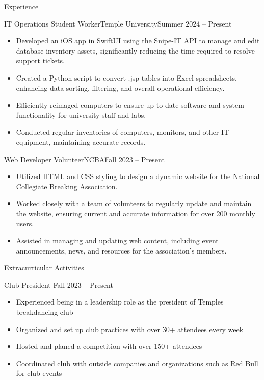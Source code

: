 \documentclass[]{mcdowellcv}
\begin{document}
	\begin{cvsection}{Experience}
		\begin{cvsubsection}{IT Operations Student Worker}{Temple University}{Summer 2024 -- Present}			
			\begin{itemize}
				\item Developed an iOS app in SwiftUI using the Snipe-IT API to manage and edit database inventory assets, significantly reducing the time required to resolve support tickets.
				\item Created a Python script to convert .jsp tables into Excel spreadsheets, enhancing data sorting, filtering, and overall operational efficiency.
				\item Efficiently reimaged computers to ensure up-to-date software and system functionality for university staff and labs.
				\item Conducted regular inventories of computers, monitors, and other IT equipment, maintaining accurate records.
			\end{itemize}
		\end{cvsubsection}
		
		\begin{cvsubsection}{Web Developer Volunteer}{NCBA}{Fall 2023 -- Present}	
			\begin{itemize}
				\item Utilized HTML and CSS styling to design a dynamic website for the National Collegiate Breaking Association.
				\item Worked closely with a team of volunteers to regularly update and maintain the website, ensuring current and accurate information for over 200 monthly users.
				\item Assisted in managing and updating web content, including event announcements, news, and resources for the association's members.
			\end{itemize}
		\end{cvsubsection}
	\end{cvsection}

	
	\begin{cvsection}{Extracurricular Activities}
		\begin{cvsubsection}{Club President}{}{ Fall 2023 -- Present}	
			\begin{itemize}
				\item Experienced being in a leadership role as the president of Temples breakdancing club
				\item Organized and set up club practices with over 30+ attendees every week
				\item Hosted and planed a competition with over 150+ attendees
				\item Coordinated club with outside companies and organizations such as Red Bull for club events
			\end{itemize}
		\end{cvsubsection}
	\end{cvsection}
\end{document}

